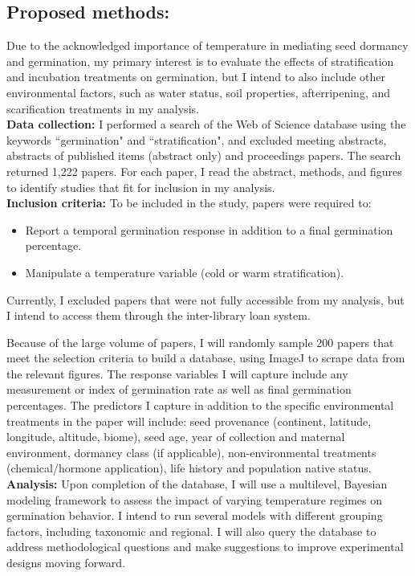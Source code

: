 \documentclass[12pt]{article}\usepackage[]{graphicx}\usepackage[]{color}
\begin{document}
\subsection*{Proposed methods:}
\indent\indent Due to the acknowledged importance of temperature in mediating seed dormancy and germination, my primary interest is to evaluate the effects of stratification and incubation treatments on germination, but I intend to also include other environmental factors, such as water status, soil properties, afterripening, and scarification treatments in my analysis.\\
\indent\textbf{Data collection:} I performed a search of the Web of Science database using the keywords ``germination" and ``stratification", and excluded meeting abstracts, abstracts of published items (abstract only) and proceedings papers. The search returned 1,222 papers. For each paper, I read the abstract, methods, and figures to identify studies that fit for inclusion in my analysis.\\
\indent\textbf{Inclusion criteria:} To be included in the study, papers were required to:
\begin{itemize}
\item Report a temporal germination response in addition to a final germination percentage.
\item Manipulate a temperature variable (cold or warm stratification).
\end{itemize}
Currently, I excluded papers that were not fully accessible from my analysis, but I intend to access them through the inter-library loan system. 
\par Because of the large volume of papers, I will randomly sample 200 papers that meet the selection criteria to build a database, using ImageJ to scrape data from the relevant figures. The response variables I will capture include any measurement or index of germination rate as well as final germination percentages. The predictors I capture in addition to the specific environmental treatments in the paper will include: seed provenance (continent, latitude, longitude, altitude, biome), seed age, year of collection and maternal environment, dormancy class (if applicable), non-environmental treatments (chemical/hormone application), life history and population native status.\\
\indent\indent\textbf{Analysis:} Upon completion of the database, I will use a multilevel, Bayesian modeling framework to assess the impact of varying temperature regimes on germination behavior. I intend to run several models with different grouping factors, including taxonomic and regional. I will also query the database to address methodological questions and make suggestions to improve experimental designs moving forward. 
\end{document}
